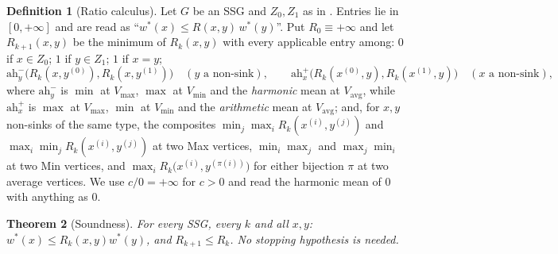 \documentclass[11pt]{article}
\theoremstyle{plain}
\newtheorem{theorem}{Theorem}[section]
\theoremstyle{definition}
\newtheorem{definition}[theorem]{Definition}
\newcommand{\Vmax}{V_{\max}}
\newcommand{\Vmin}{V_{\min}}
\newcommand{\Vavg}{V_{\mathrm{avg}}}
\begin{document}
\begin{definition}[Ratio calculus]\label{def:ratio}
Let $G$ be an SSG and $Z_0,Z_1$ as in . Entries lie in
$[0,+\infty]$ and are read as ``$w^\ast(x)\le R(x,y)\,w^\ast(y)$''. Put
$R_0\equiv+\infty$ and let $R_{k+1}(x,y)$ be the minimum of $R_k(x,y)$
with every applicable entry among: $0$ if $x\in Z_0$; $1$ if $y\in Z_1$;
$1$ if $x=y$;
\[
  \mathrm{ah}^{-}_{y}\bigl(R_k(x,y^{(0)}),R_k(x,y^{(1)})\bigr)
  \quad(y\text{ a non-sink}),\qquad
  \mathrm{ah}^{+}_{x}\bigl(R_k(x^{(0)},y),R_k(x^{(1)},y)\bigr)
  \quad(x\text{ a non-sink}),
\]
where $\mathrm{ah}^{-}_{y}$ is $\min$ at $\Vmax$, $\max$ at $\Vmin$ and
the \emph{harmonic} mean at $\Vavg$, while $\mathrm{ah}^{+}_{x}$ is
$\max$ at $\Vmax$, $\min$ at $\Vmin$ and the \emph{arithmetic} mean at
$\Vavg$; and, for $x,y$ non-sinks of the same type, the composites
$\min_j\max_i R_k(x^{(i)},y^{(j)})$ and $\max_i\min_j R_k(x^{(i)},y^{(j)})$
at two Max vertices, $\min_i\max_j$ and $\max_j\min_i$ at two Min
vertices, and $\max_i R_k\bigl(x^{(i)},y^{(\pi(i))}\bigr)$ for either
bijection $\pi$ at two average vertices. We use $c/0=+\infty$ for $c>0$
and read the harmonic mean of $0$ with anything as $0$.
\end{definition}

\begin{theorem}[Soundness]\label{thm:ratio-sound}
For every SSG, every $k$ and all $x,y$: $w^\ast(x)\le R_k(x,y)w^\ast(y)$,
and $R_{k+1}\le R_k$. No stopping hypothesis is needed.
\end{theorem}
\end{document}
